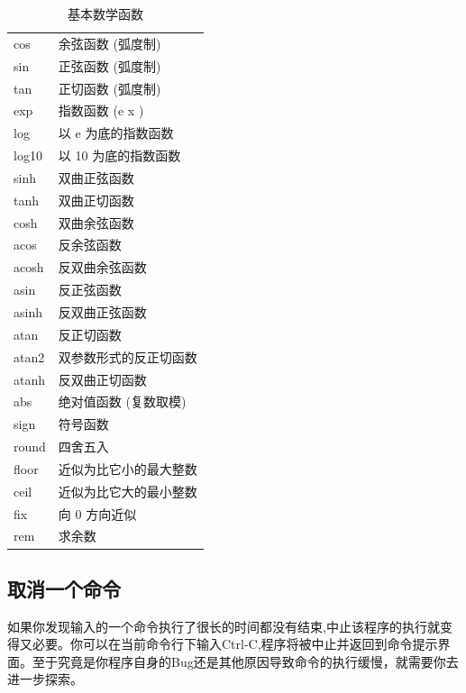 \documentclass[a4paper,11pt]{ctexart}
\begin{document}
\begin{table}[H]
	\centering
	\begin{tabular}{L{6cm}L{5cm}}
		\hline
cos & 余弦函数 (弧度制)				\\
sin  &正弦函数 (弧度制)	\\
tan & 正切函数 (弧度制)	\\
exp & 指数函数 (e x )	\\
log & 以 e 为底的指数函数	\\
log10 & 以 10 为底的指数函数	\\
sinh & 双曲正弦函数	\\
tanh & 双曲正切函数	\\
cosh & 双曲余弦函数	\\
acos & 反余弦函数	\\
acosh & 反双曲余弦函数	\\
asin & 反正弦函数	\\
asinh & 反双曲正弦函数	\\
atan & 反正切函数	\\
atan2 & 双参数形式的反正切函数 	\\
atanh & 反双曲正切函数	\\
abs & 绝对值函数 (复数取模)	\\
sign & 符号函数	\\
round & 四舍五入	\\
floor & 近似为比它小的最大整数	\\
ceil & 近似为比它大的最小整数	\\
fix & 向 0 方向近似	\\
rem & 求余数	\\
\hline
	\end{tabular}
	\caption{基本数学函数}
\end{table}
\subsection{取消一个命令}
如果你发现输入的一个命令执行了很长的时间都没有结束,中止该程序的执行就变得又必要。你可以在当前命令行下输入Ctrl-C,程序将被中止并返回到命令提示界面。至于究竟是你程序自身的Bug还是其他原因导致命令的执行缓慢，就需要你去进一步探索。
\end{document}
